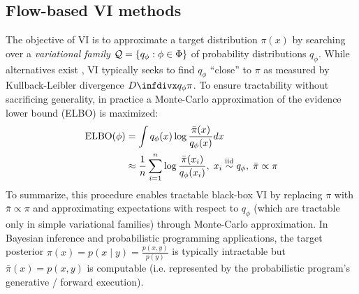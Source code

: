 \documentclass[twoside]{article}
\theoremstyle{definition}
\theoremstyle{remark}
\begin{document}

\vspace{-2mm}
\subsection{Flow-based VI methods} 

The objective of VI is to approximate a target distribution $\pi(x)$ by searching over
a \emph{variational family} $\mathcal{Q} = \{q_\phi : \phi \in \Phi\}$ of probability distributions $q_\phi$.
While alternatives exist \citep{li2016variational,wang2018variational}, VI typically
seeks to find $q_\phi$ ``close'' to $\pi$ as measured by Kullback-Leibler divergence $\infdiv{q_\phi}{\pi}$.
To ensure tractability without sacrificing generality, in practice \citep{wingate2013automated,ranganath2014black}
a Monte-Carlo approximation of the evidence lower bound (ELBO) is maximized:
\begin{align*}
  \text{ELBO}(\phi)
  &= \int q_\phi(x) \log \frac{\bar\pi(x)}{q_\phi(x)} dx\\
  & \approx \frac{1}{n} \sum_{i=1}^n \log \frac{\bar\pi(x_i)}{q_\phi(x_i)},\;
  x_i \overset{\text{iid}}{\sim} q_\phi,\;
  \bar{\pi} \propto \pi
\end{align*}
To summarize, this procedure enables tractable black-box VI
by replacing $\pi$ with $\bar\pi \propto \pi$ and approximating expectations with respect to $q_\phi$ (which are tractable only in simple variational families) through Monte-Carlo approximation. In Bayesian inference and probabilistic programming applications, the target posterior
$\pi(x) = p(x \mid y) = \frac{p(x, y)}{p(y)}$ is typically intractable but
$\bar\pi(x) = p(x,y)$ is computable (i.e. represented by the probabilistic program's
generative / forward execution).
\end{document}
